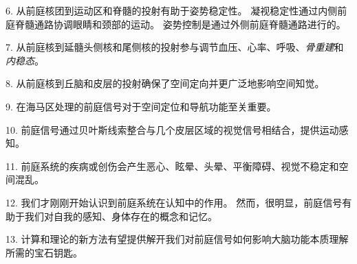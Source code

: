 6. 从前庭核团到运动区和脊髓的投射有助于姿势稳定性。
凝视稳定性通过内侧前庭脊髓通路协调眼睛和颈部的运动。
姿势控制是通过外侧前庭脊髓通路进行的。


7. 从前庭核到延髓头侧核和尾侧核的投射参与调节血压、心率、呼吸、\textit{骨重建}和\textit{内稳态}。


8. 从前庭核到丘脑和皮层的投射确保了空间定向并更广泛地影响空间知觉。


9. 在海马区处理的前庭信号对于空间定位和导航功能至关重要。


10. 前庭信号通过贝叶斯线索整合与几个皮层区域的视觉信号相结合，提供运动感知。


11. 前庭系统的疾病或创伤会产生恶心、眩晕、头晕、平衡障碍、视觉不稳定和空间混乱。


12. 我们才刚刚开始认识到前庭系统在认知中的作用。
然而，很明显，前庭信号有助于我们对自我的感知、身体存在的概念和记忆。


13. 计算和理论的新方法有望提供解开我们对前庭信号如何影响大脑功能本质理解所需的宝石钥匙。




